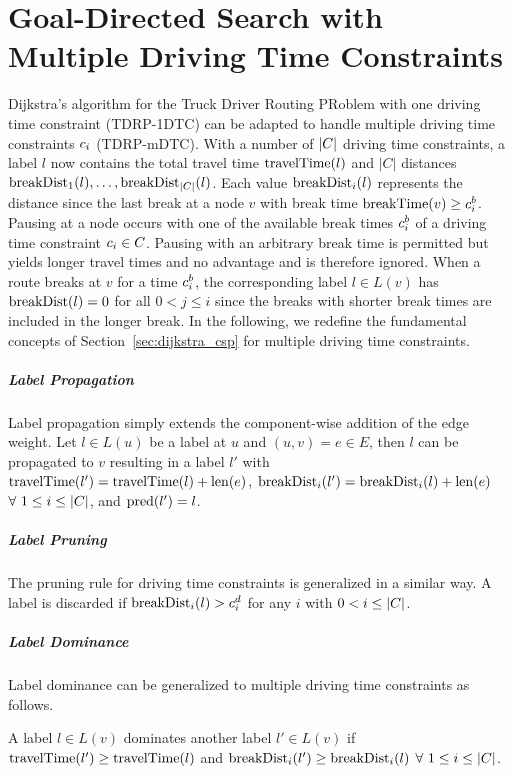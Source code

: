 \section{Goal-Directed Search with Multiple Driving Time Constraints\label{section:n_csp}}
Dijkstra's algorithm for the Truck Driver Routing PRoblem with one driving time constraint (TDRP-1DTC) can be adapted to handle multiple driving time constraints $c_i$ (TDRP-mDTC). With a number of $|C|$ driving time constraints, a label $l$ now contains the total travel time $\operatorname{travelTime}(l)$ and $|C|$ distances $\operatorname{breakDist}_1(l), \ldots , \operatorname{breakDist}_{|C|}(l)$. Each value $\operatorname{breakDist}_i(l)$ represents the distance since the last break at a node $v$ with break time $\operatorname{breakTime}(v) \ge c_i^b$. Pausing at a node occurs with one of the available break times $c_i^b$ of a driving time constraint $c_i \in C$. Pausing with an arbitrary break time is permitted but yields longer travel times and no advantage and is therefore ignored. When a route breaks at $v$ for a time $c_i^b$, the corresponding label $l \in L(v)$ has $\operatorname{breakDist}(l) = 0$ for all $0 < j \le i$ since the breaks with shorter break times are included in the longer break. In the following, we redefine the fundamental concepts of Section~\ref{sec:dijkstra_csp} for multiple driving time constraints.

\subparagraph{Label Propagation}
Label propagation simply extends the component-wise addition of the edge weight. Let $l \in L(u)$ be a label at $u$ and $(u,v) = e \in E$, then $l$ can be propagated to $v$ resulting in a label $l'$ with $\operatorname{travelTime}(l') = \operatorname{travelTime}(l) + \operatorname{len}(e)$, $\operatorname{breakDist}_i(l') = \operatorname{breakDist}_i(l) + \operatorname{len}(e)$ $\forall\ 1 \le i \le |C|$, and $\operatorname{pred}(l') = l$.

\subparagraph{Label Pruning}
The pruning rule for driving time constraints is generalized in a similar way. A label is discarded if $\operatorname{breakDist}_i(l) > c_i^d$ for any $i$ with $0 < i \le |C|$.


\subparagraph{Label Dominance}
Label dominance can be generalized to multiple driving time constraints as follows.

\begin{definition}
	A label $l \in L(v)$ dominates another label $l' \in L(v)$ if $\operatorname{travelTime}(l') \ge \operatorname{travelTime}(l)$ and $\operatorname{breakDist}_i(l') \ge \operatorname{breakDist}_i(l)$ $\forall\ 1 \le i \le |C|$.
\end{definition}

